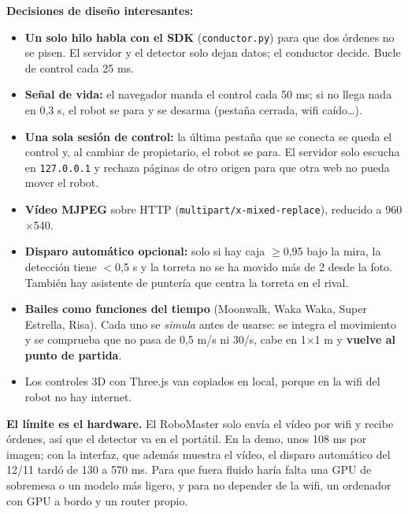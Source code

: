 \documentclass[11pt,a4paper]{article}
\newcommand{\cod}[1]{\texttt{#1}}
\newcommand{\gr}{\textdegree{}}
\begin{document}
\textbf{Decisiones de diseño interesantes:}
\begin{itemize}
  \item \textbf{Un solo hilo habla con el SDK} (\cod{conductor.py}) para que dos órdenes no se pisen. El servidor y el detector solo dejan datos; el conductor decide. Bucle de control cada 25 ms.
  \item \textbf{Señal de vida:} el navegador manda el control cada 50 ms; si no llega nada en 0,3 s, el robot se para y se desarma (pestaña cerrada, wifi caído\ldots).
  \item \textbf{Una sola sesión de control:} la última pestaña que se conecta se queda el control y, al cambiar de propietario, el robot se para. El servidor solo escucha en \cod{127.0.0.1} y rechaza páginas de otro origen para que otra web no pueda mover el robot.
  \item \textbf{Vídeo MJPEG} sobre HTTP (\cod{multipart/\allowbreak{}x-mixed-replace}), reducido a 960$\times$540.
  \item \textbf{Disparo automático opcional:} solo si hay caja $\ge$0,95 bajo la mira, la detección tiene $<$0,5 s y la torreta no se ha movido más de 2\gr{} desde la foto. También hay asistente de puntería que centra la torreta en el rival.
  \item \textbf{Bailes como funciones del tiempo} (Moonwalk, Waka Waka, Super Estrella, Risa). Cada uno se \emph{simula} antes de usarse: se integra el movimiento y se comprueba que no pasa de 0,5 m/s ni 30\gr/s, cabe en 1$\times$1 m y \textbf{vuelve al punto de partida}.
  \item Los controles 3D con Three.js van copiados en local, porque en la wifi del robot no hay internet.
\end{itemize}

\textbf{El límite es el hardware.} El RoboMaster solo envía el vídeo por wifi y recibe órdenes, así que el detector va en el portátil. En la demo, unos 108 ms por imagen; con la interfaz, que además muestra el vídeo, el disparo automático del 12/11 tardó de 130 a 570 ms. Para que fuera fluido haría falta una GPU de sobremesa o un modelo más ligero, y para no depender de la wifi, un ordenador con GPU a bordo y un router propio.

\end{document}
